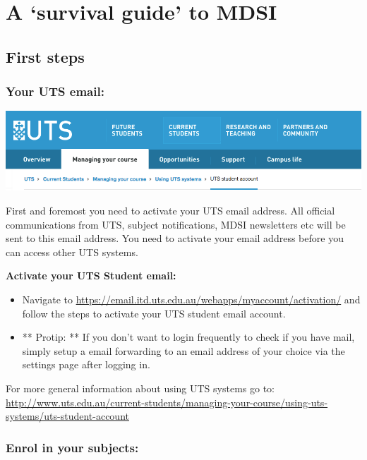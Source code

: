 \documentclass[]{book}
\providecommand{\tightlist}{%
  \setlength{\itemsep}{0pt}\setlength{\parskip}{0pt}}
\theoremstyle{definition}
\theoremstyle{definition}
\theoremstyle{remark}
\begin{document}
\chapter{\texorpdfstring{A `survival guide' to
MDSI}{A survival guide to MDSI}}\label{a-survival-guide-to-mdsi}

\section{First steps}\label{first-steps}

\subsection{Your UTS email:}\label{your-uts-email}

\includegraphics{images/UTSmanagecourseBanner.png}

First and foremost you need to activate your UTS email address. All
official communications from UTS, subject notifications, MDSI
newsletters etc will be sent to this email address. You need to activate
your email address before you can access other UTS systems.

\textbf{Activate your UTS Student email:}

\begin{itemize}
\tightlist
\item
  Navigate to
  \url{https://email.itd.uts.edu.au/webapps/myaccount/activation/} and
  follow the steps to activate your UTS student email account.
\item
  ** Protip: ** If you don't want to login frequently to check if you
  have mail, simply setup a email forwarding to an email address of your
  choice via the settings page after logging in.
\end{itemize}

For more general information about using UTS systems go to:
\url{http://www.uts.edu.au/current-students/managing-your-course/using-uts-systems/uts-student-account}

\subsection{Enrol in your subjects:}\label{enrol-in-your-subjects}
\end{document}
